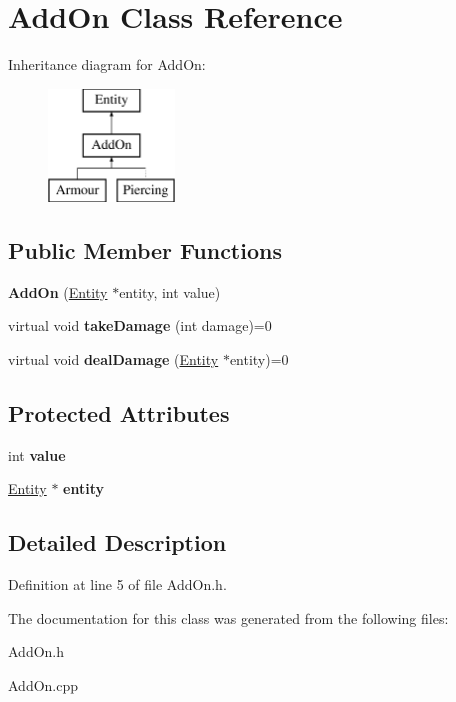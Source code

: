 \hypertarget{classAddOn}{}\section{Add\+On Class Reference}
\label{classAddOn}
Inheritance diagram for Add\+On\+:\begin{figure}[H]
\begin{center}
\leavevmode
\includegraphics[height=3.000000cm]{classAddOn}
\end{center}
\end{figure}
\subsection*{Public Member Functions}
\begin{DoxyCompactItemize}
\item 
\mbox{\label{classAddOn_abb1bfa4bf3040a25a5933ad956c165c9}} 
{\bfseries Add\+On} (\hyperlink{classEntity}{Entity} $\ast$entity, int value)
\item 
\mbox{\label{classAddOn_ab3aefbc00969fe613ed6d42c4f55c5a2}} 
virtual void {\bfseries take\+Damage} (int damage)=0
\item 
\mbox{\label{classAddOn_aff1f4fa0fb368bbc49838df9c9ddba9c}} 
virtual void {\bfseries deal\+Damage} (\hyperlink{classEntity}{Entity} $\ast$entity)=0
\end{DoxyCompactItemize}
\subsection*{Protected Attributes}
\begin{DoxyCompactItemize}
\item 
\mbox{\label{classAddOn_a5c051eef3f3e8200d5a48cfc50174f91}} 
int {\bfseries value}
\item 
\mbox{\label{classAddOn_aaa321002131799f305663626784e364e}} 
\hyperlink{classEntity}{Entity} $\ast$ {\bfseries entity}
\end{DoxyCompactItemize}


\subsection{Detailed Description}


Definition at line 5 of file Add\+On.\+h.



The documentation for this class was generated from the following files\+:\begin{DoxyCompactItemize}
\item 
Add\+On.\+h\item 
Add\+On.\+cpp\end{DoxyCompactItemize}
